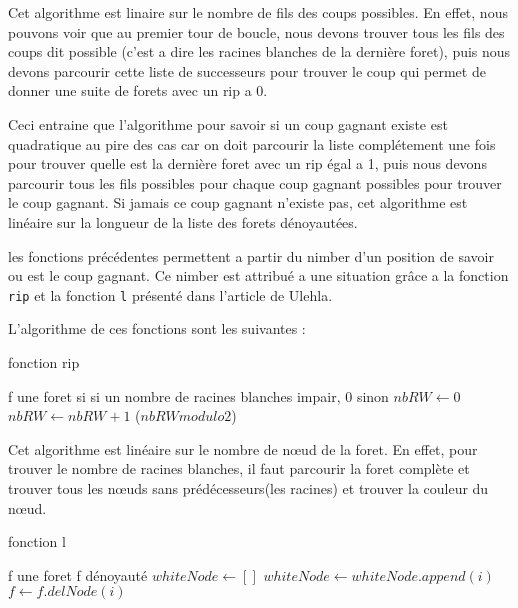 Cet algorithme est linaire sur le nombre de fils des coups possibles. En effet, nous pouvons voir que au premier tour de boucle, nous devons trouver tous les fils des coups dit possible (c'est a dire les racines blanches de la dernière foret), puis nous devons parcourir cette liste de successeurs pour trouver le coup qui permet de donner une suite de forets avec un rip a 0.

Ceci entraine que l'algorithme pour savoir si un coup gagnant existe est quadratique au pire des cas car on doit parcourir la liste complétement une fois pour trouver quelle est la dernière foret avec un rip égal a 1, puis nous devons parcourir tous les fils possibles pour chaque coup gagnant possibles pour trouver le coup gagnant. Si jamais ce coup gagnant n'existe pas, cet algorithme est linéaire sur la longueur de la liste des forets dénoyautées.

les fonctions précédentes permettent a partir du nimber d'un position de savoir ou est le coup gagnant. Ce nimber est attribué a une situation grâce a la fonction \texttt{rip} et la fonction \texttt{l} présenté dans l'article de Ulehla.

L'algorithme de ces fonctions sont les suivantes :
\clearpage
\begin{algorithm}[hbt]
  \caption{fonction rip}
    \begin{algorithmic}
    \REQUIRE f une foret
     si si un nombre de racines blanches impair, 0 sinon
    \STATE $nbRW \leftarrow 0$
        \STATE $nbRW \leftarrow nbRW + 1$
      \ENDIF
    \ENDFOR
    \RETURN ($nbRW modulo 2$)
  \end{algorithmic}
\end{algorithm}    

Cet algorithme est linéaire sur le nombre de nœud de la foret. En effet, pour trouver le nombre de racines blanches, il faut parcourir la foret complète et trouver tous les nœuds sans prédécesseurs(les racines) et trouver la couleur du nœud.

\begin{algorithm}[hbt]
  \caption{fonction l}
  \begin{algorithmic}
    \REQUIRE f une foret
    \ENSURE f dénoyauté
    \STATE $whiteNode \leftarrow []$
        \STATE $whiteNode \leftarrow whiteNode.append(i)$
      \ENDIF
    \ENDFOR
      \STATE $f \leftarrow f.delNode(i)$
    \ENDFOR
  \end{algorithmic}
\end{algorithm}

